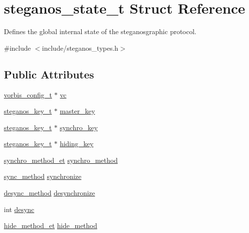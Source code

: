 \hypertarget{structsteganos__state__t}{
\section{steganos\_\-state\_\-t Struct Reference}
\label{structsteganos__state__t}
}


Defines the global internal state of the steganosgraphic protocol.  


{\ttfamily \#include $<$include/steganos\_\-types.h$>$}\subsection*{Public Attributes}
\begin{DoxyCompactItemize}
\item 
\hyperlink{structvorbis__config__t}{vorbis\_\-config\_\-t} $\ast$ \hyperlink{structsteganos__state__t_ade7b06cf61e74c7684a3eb9822e51ada}{vc}
\item 
\hyperlink{structsteganos__key__t}{steganos\_\-key\_\-t} $\ast$ \hyperlink{structsteganos__state__t_aa0d2cbc935164c4627d9960c97c2e466}{master\_\-key}
\item 
\hyperlink{structsteganos__key__t}{steganos\_\-key\_\-t} $\ast$ \hyperlink{structsteganos__state__t_a0c48742bec665d03c8f6b19b6adf69c2}{synchro\_\-key}
\item 
\hyperlink{structsteganos__key__t}{steganos\_\-key\_\-t} $\ast$ \hyperlink{structsteganos__state__t_a962efb329a129c32e8a1a08731bd81ba}{hiding\_\-key}
\item 
\hyperlink{steganos__types_8h_a1a1afa313dff1694d410bace75c29961}{synchro\_\-method\_\-et} \hyperlink{structsteganos__state__t_ad4393617819cf79697d9b126ad6142ba}{synchro\_\-method}
\item 
\hyperlink{steganos__types_8h_ac758d5077b8857eb7a2059be7f6b2e03}{sync\_\-method} \hyperlink{structsteganos__state__t_ab83b4da83ea658612368de71cf25ab3b}{synchronize}
\item 
\hyperlink{steganos__types_8h_a3423b8602d2248745bfd5ff836dafe31}{desync\_\-method} \hyperlink{structsteganos__state__t_a038d9b8c4d75e1e2cf047b0d89e7a07a}{desynchronize}
\item 
int \hyperlink{structsteganos__state__t_ac771d3a52f60267c41251f183578a873}{desync}
\item 
\hyperlink{steganos__types_8h_af9031c1f060b0b2c34fcd5a3cc32ffbd}{hide\_\-method\_\-et} \hyperlink{structsteganos__state__t_ad48f948c5024ec76b3a9bece54124d66}{hide\_\-method}
\item 

\end{DoxyCompactItemize}
